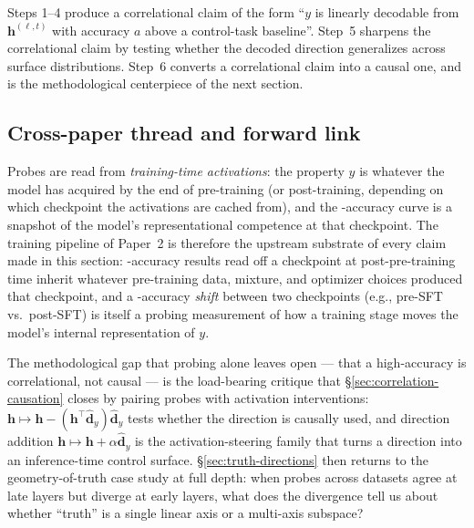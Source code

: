 Steps 1--4 produce a correlational claim of the form ``$y$ is linearly
decodable from $\mathbf{h}^{(\ell, t)}$ with accuracy $a$ above a
control-task baseline''. Step~5 sharpens the correlational claim by
testing whether the decoded direction generalizes across surface
distributions. Step~6 converts a correlational claim into a causal one,
and is the methodological centerpiece of the next section.

\subsection{Cross-paper thread and forward link}
\label{sec:probe-forward}

Probes are read from \emph{training-time activations}: the property
$y$ is whatever the model has acquired by the end of pre-training (or
post-training, depending on which checkpoint the activations are cached
from), and the -accuracy curve is a snapshot of the model's
representational competence at that checkpoint. The training pipeline
of Paper~2 is therefore the upstream substrate of every claim made in
this section: -accuracy results read off a checkpoint at
post-pre-training time inherit whatever pre-training data, mixture, and
optimizer choices produced that checkpoint, and a -accuracy
\emph{shift} between two checkpoints (e.g., pre-SFT vs.\ post-SFT) is
itself a probing measurement of how a training stage moves the model's
internal representation of $y$.

The methodological gap that probing alone leaves open — that a
high-accuracy  is correlational, not causal — is the
load-bearing critique that
\S\ref{sec:correlation-causation} closes by pairing probes with
activation interventions: 
$\mathbf{h} \mapsto \mathbf{h} - (\mathbf{h}^\top \hat{\mathbf{d}}_y)\hat{\mathbf{d}}_y$
tests whether the direction is causally used, and direction addition
$\mathbf{h} \mapsto \mathbf{h} + \alpha \hat{\mathbf{d}}_y$ is the
activation-steering family that turns a  direction into an
inference-time control surface. \S\ref{sec:truth-directions} then
returns to the geometry-of-truth case study at full depth: when probes
across datasets agree at late layers but diverge at early layers, what
does the divergence tell us about whether ``truth'' is a single linear
axis or a multi-axis subspace?
